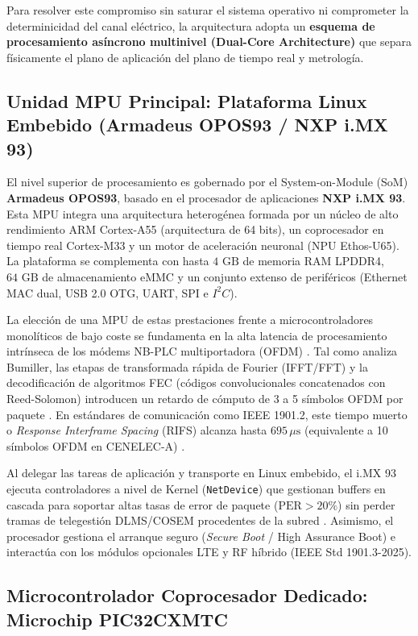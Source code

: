 Para resolver este compromiso sin saturar el sistema operativo ni comprometer la determinicidad del canal eléctrico, la arquitectura adopta un \textbf{esquema de procesamiento asíncrono multinivel (Dual-Core Architecture)} que separa físicamente el plano de aplicación del plano de tiempo real y metrología.

\subsection{Unidad MPU Principal: Plataforma Linux Embebido (Armadeus OPOS93 / NXP i.MX 93)}
\label{subsec:mpu_linux}

El nivel superior de procesamiento es gobernado por el System-on-Module (SoM) \textbf{Armadeus OPOS93}, basado en el procesador de aplicaciones \textbf{NXP i.MX 93}. Esta MPU integra una arquitectura heterogénea formada por un núcleo de alto rendimiento ARM Cortex-A55 (arquitectura de 64 bits), un coprocesador en tiempo real Cortex-M33 y un motor de aceleración neuronal (NPU Ethos-U65). La plataforma se complementa con hasta $4\text{ GB}$ de memoria RAM LPDDR4, $64\text{ GB}$ de almacenamiento eMMC y un conjunto extenso de periféricos (Ethernet MAC dual, USB 2.0 OTG, UART, SPI e $I^2C$).

La elección de una MPU de estas prestaciones frente a microcontroladores monolíticos de bajo coste se fundamenta en la alta latencia de procesamiento intrínseca de los módems NB-PLC multiportadora (OFDM) \cite{7147624}. Tal como analiza Bumiller, las etapas de transformada rápida de Fourier (IFFT/FFT) y la decodificación de algoritmos FEC (códigos convolucionales concatenados con Reed-Solomon) introducen un retardo de cómputo de 3 a 5 símbolos OFDM por paquete \cite{7147624}. En estándares de comunicación como IEEE 1901.2, este tiempo muerto o \textit{Response Interframe Spacing} (RIFS) alcanza hasta $695\,\mu\text{s}$ (equivalente a 10 símbolos OFDM en CENELEC-A) \cite{7147624}.

Al delegar las tareas de aplicación y transporte en Linux embebido, el i.MX 93 ejecuta controladores a nivel de Kernel (\texttt{NetDevice}) que gestionan buffers en cascada para soportar altas tasas de error de paquete ($\text{PER} > 20\%$) sin perder tramas de telegestión DLMS/COSEM procedentes de la subred \cite{7147624, 7778783}. Asimismo, el procesador gestiona el arranque seguro (\textit{Secure Boot} / High Assurance Boot) e interactúa con los módulos opcionales LTE y RF híbrido (IEEE Std 1901.3-2025).

\subsection{Microcontrolador Coprocesador Dedicado: Microchip PIC32CXMTC}
\label{subsec:coprocesador_pic32}

